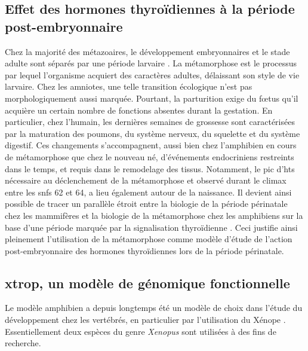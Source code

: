 \documentclass[../main.tex]{subfiles}
\begin{document}

\subsection{Effet des hormones thyroïdiennes à la période post-embryonnaire}
Chez la majorité des métazoaires, le développement embryonnaires et le stade adulte sont séparés par une période larvaire \citep{Laudet2011b,Holstein2014}.
La métamorphose est le processus par lequel l'organisme acquiert des caractères adultes, délaissant son style de vie larvaire.
Chez les amniotes, une telle transition écologique n'est pas morphologiquement aussi marquée.
Pourtant, la parturition exige du fœtus qu'il acquière un certain nombre de fonctions absentes durant la gestation.
En particulier, chez l'humain, les dernières semaines de grossesse sont caractérisées par la maturation des poumons, du système nerveux, du squelette et du système digestif.
Ces changements s'accompagnent, aussi bien chez l'amphibien en cours de métamorphose que chez le nouveau né, d'événements endocriniens restreints dans le temps, et requis dans le remodelage des tissus.
Notamment, le pic d'\glspl{ht} nécessaire au déclenchement de la métamorphose et observé durant le climax entre les \glspl{snf} 62 et 64, a lieu également autour de la naissance.
Il devient ainsi possible de tracer un parallèle étroit entre la biologie de la période périnatale chez les mammifères et la biologie de la métamorphose chez les amphibiens sur la base d'une période marquée par la signalisation thyroïdienne \citep{Laudet2011b}.
Ceci justifie ainsi pleinement l'utilisation de la métamorphose comme modèle d'étude de l'action post-embryonnaire des hormones thyroïdiennes lors de la période périnatale. 


\subsection{\gls{xtrop}, un modèle de génomique fonctionnelle}\label{subsec:xtrop-model}
Le modèle amphibien a depuis longtemps été un modèle de choix dans l'étude du développement chez les vertébrés, en particulier par l'utilisation du Xénope \citep{Harland2011}.
Essentiellement deux espèces du genre \textit{Xenopus} sont utilisées à des fins de recherche.
\end{document}
